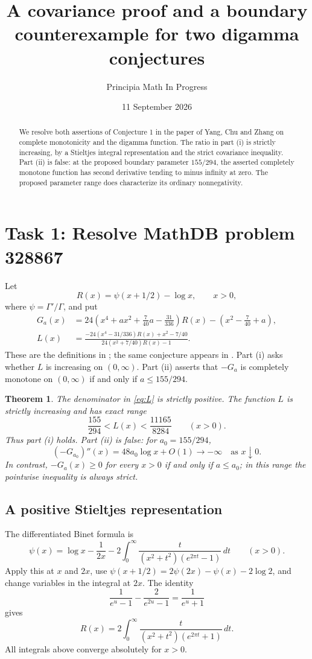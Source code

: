 \documentclass[11pt]{article}
\title{A covariance proof and a boundary counterexample\newline
for two digamma conjectures}
\author{Principia Math In Progress}
\date{11 September 2026}
\newtheorem{theorem}{Theorem}
\begin{document}
\maketitle
\begin{abstract}
We resolve both assertions of Conjecture 1 in the paper of Yang, Chu
and Zhang on complete monotonicity and the digamma function.
The ratio in part (i) is strictly increasing, by a Stieltjes integral
representation and the strict covariance inequality. Part (ii) is false:
at the proposed boundary parameter $155/294$, the asserted completely
monotone function has second derivative tending to minus infinity at zero.
The proposed parameter range does characterize its ordinary nonnegativity.
\end{abstract}

\section*{Task 1: Resolve MathDB problem 328867}
Let
\[
 R(x)=\psi(x+1/2)-\log x,\qquad x>0,
\]
where $\psi=\Gamma'/\Gamma$, and put
\begin{align}
 G_a(x)&=24\left(x^4+ax^2+\frac7{40}a-\frac{31}{336}\right)R(x)
              -\left(x^2-\frac7{40}+a\right),\label{eq:Ga}\\
 L(x)&=\frac{-24(x^4-31/336)R(x)+x^2-7/40}
                 {24(x^2+7/40)R(x)-1}.\label{eq:L}
\end{align}
These are the definitions in \cite[Sections 3--4]{published}; the same
conjecture appears in \cite[Conjecture 1, p.~14]{preprint}.
Part (i) asks whether $L$ is increasing on $(0,\infty)$.
Part (ii) asserts that $-G_a$ is completely monotone on $(0,\infty)$
if and only if $a\leq155/294$.

\begin{theorem}\label{thm:result}
The denominator in \eqref{eq:L} is strictly positive. The function $L$
is strictly increasing and has exact range
\[
 \frac{155}{294}<L(x)<\frac{11165}{8284}\qquad(x>0).
\]
Thus part (i) holds. Part (ii) is false: for $a_0=155/294$,
\[
 (-G_{a_0})''(x)=48a_0\log x+O(1)\longrightarrow-\infty
 \quad\text{as }x\downarrow0.
\]
In contrast, $-G_a(x)\geq0$ for every $x>0$ if and only if $a\leq a_0$;
in this range the pointwise inequality is always strict.
\end{theorem}

\subsection*{A positive Stieltjes representation}
The differentiated Binet formula \cite[Eq.~5.9.15]{dlmf} is
\[
 \psi(x)=\log x-\frac1{2x}
  -2\int_0^\infty\frac{t}{(x^2+t^2)(e^{2\pi t}-1)}\,dt
 \qquad(x>0).
\]
Apply this at $x$ and $2x$, use
$\psi(x+1/2)=2\psi(2x)-\psi(x)-2\log2$, and change variables in the
integral at $2x$. The identity
\[
 \frac1{e^u-1}-\frac2{e^{2u}-1}=\frac1{e^u+1}
\]
gives
\begin{equation}\label{eq:stieltjes}
 R(x)=2\int_0^\infty\frac{t}{(x^2+t^2)(e^{2\pi t}+1)}\,dt.
\end{equation}
All integrals above converge absolutely for $x>0$.
\end{document}
